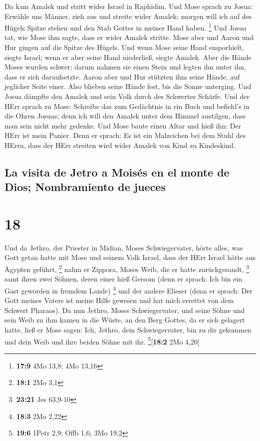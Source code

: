  Da kam Amalek und stritt wider Israel in Raphidim.
 Und Mose sprach zu Josua: Erwähle uns Männer, zieh aus
und streite wider Amalek; morgen will ich auf des Hügels Spitze stehen
und den Stab Gottes in meiner Hand haben. \footnote{\textbf{17:9} 4Mo
  13,8; 4Mo 13,16}  Und Josua tat, wie Mose ihm sagte,
dass er wider Amalek stritte. Mose aber und Aaron und Hur gingen auf die
Spitze des Hügels.  Und wenn Mose seine Hand emporhielt,
siegte Israel; wenn er aber seine Hand niederließ, siegte Amalek.
 Aber die Hände Moses wurden schwer; darum nahmen sie
einen Stein und legten ihn unter ihn, dass er sich daraufsetzte. Aaron
aber und Hur stützten ihm seine Hände, auf jeglicher Seite einer. Also
blieben seine Hände fest, bis die Sonne unterging.  Und
Josua dämpfte den Amalek und sein Volk durch des Schwertes Schärfe.
 Und der HErr sprach zu Mose: Schreibe das zum Gedächtnis
in ein Buch und befiehl's in die Ohren Josuas; denn ich will den Amalek
unter dem Himmel austilgen, dass man sein nicht mehr gedenke.
 Und Mose baute einen Altar und hieß ihn: Der HErr ist
mein Panier.  Denn er sprach: Es ist ein Malzeichen bei
dem Stuhl des HErrn, dass der HErr streiten wird wider Amalek von Kind
zu Kindeskind.

\hypertarget{la-visita-de-jetro-a-moisuxe9s-en-el-monte-de-dios-nombramiento-de-jueces}{%
\subsection{La visita de Jetro a Moisés en el monte de Dios;
Nombramiento de
jueces}\label{la-visita-de-jetro-a-moisuxe9s-en-el-monte-de-dios-nombramiento-de-jueces}}

\hypertarget{section-17}{%
\section{18}\label{section-17}}

 Und da Jethro, der Priester in Midian, Moses
Schwiegervater, hörte alles, was Gott getan hatte mit Mose und seinem
Volk Israel, dass der HErr Israel hätte aus Ägypten geführt, \footnote{\textbf{18:1}
  2Mo 3,1}  nahm er Zippora, Moses Weib, die er hatte
zurückgesandt, \footnote{\textbf{23:21} Jes 63,9-10}  samt
ihren zwei Söhnen, deren einer hieß Gersom (denn er sprach: Ich bin ein
Gast geworden in fremdem Lande) \footnote{\textbf{18:3} 2Mo 2,22}
 und der andere Elieser (denn er sprach: Der Gott meines
Vaters ist meine Hilfe gewesen und hat mich errettet von dem Schwert
Pharaos).  Da nun Jethro, Moses Schwiegervater, und seine
Söhne und sein Weib zu ihm kamen in die Wüste, an den Berg Gottes, da er
sich gelagert hatte,  ließ er Mose sagen: Ich, Jethro,
dein Schwiegervater, bin zu dir gekommen und dein Weib und ihre beiden
Söhne mit ihr. \footnote{\textbf{19:6} 1Petr 2,9; Offb 1,6; 3Mo 19,2}{[}\textbf{18:2}
2Mo 4,20{]}

